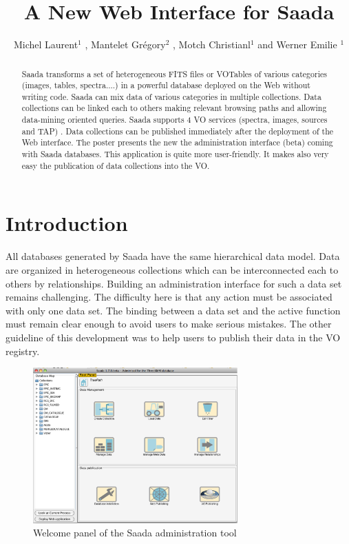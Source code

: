 \documentclass[11pt,twoside]{article}
\begin{document}
\title{A New Web Interface for Saada}
\author{Michel Laurent$^1$ , Mantelet Gr\'egory$^2$ ,  Motch Christianl$^1$ and  Werner Emilie $^1$}

\begin{abstract}
Saada transforms a set of heterogeneous FITS files or VOTables of various categories (images, tables, spectra....) in a powerful database deployed on the Web without writing code. Saada can mix data of various categories in multiple collections. Data collections can be linked each to others making relevant browsing paths and allowing data-mining oriented queries. Saada supports 4 VO services (spectra, images, sources and TAP) . Data collections can be published immediately after the deployment of the Web interface. The poster presents the new the administration interface (beta) coming with Saada databases. This application is quite more user-friendly. It makes also very easy the publication of data collections into the VO.
\end{abstract}

\section{Introduction}
All databases generated by Saada \citep{SAADA} have the same hierarchical data model. Data are organized in heterogeneous collections which can be interconnected each to others by relationships. Building an administration interface for such a data set remains challenging. The difficulty here is that any action must be associated with only one data set. The binding between a data set and the active function must remain clear enough to avoid users to make serious mistakes. The other guideline of this development was to help users to publish their data in the VO registry.

\begin{figure}[!h]
	\begin{center}
		\includegraphics[width=0.70\textwidth]{P18_fig1.eps}
	\end{center}
	\caption{Welcome panel of the Saada administration tool}
	\label{fig:fig1}
\end{figure}
\end{document}
